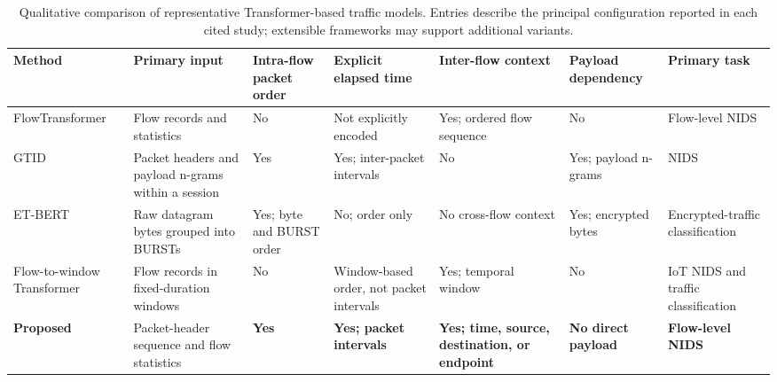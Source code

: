 \documentclass[11pt,fleqn]{report}
\begin{document}
\begin{table}[t][H]
\centering
\caption{Qualitative comparison of representative Transformer-based traffic models. Entries describe the principal configuration reported in each cited study; extensible frameworks may support additional variants.}
\label{tab:rw_model_comparison}
\scriptsize
\setlength{\tabcolsep}{2pt}
\renewcommand{\arraystretch}{1.22}
\begin{tabular}{@{}p{1.85cm}p{2.65cm}p{1.55cm}p{2.15cm}p{2.45cm}p{1.85cm}p{1.85cm}@{}}
\toprule
\textbf{Method} &
\textbf{Primary input} &
\textbf{Intra-flow packet order} &
\textbf{Explicit elapsed time} &
\textbf{Inter-flow context} &
\textbf{Payload dependency} &
\textbf{Primary task} \\
\midrule
FlowTransformer \cite{Manocchio2024FlowTransformer} &
Flow records and statistics &
No &
Not explicitly encoded &
Yes; ordered flow sequence &
No &
Flow-level NIDS \\

GTID \cite{Han2023GTID} &
Packet headers and payload n-grams within a session &
Yes &
Yes; inter-packet intervals &
No &
Yes; payload n-grams &
NIDS \\

ET-BERT \cite{Lin2022ETBERT} &
Raw datagram bytes grouped into BURSTs &
Yes; byte and BURST order &
No; order only &
No cross-flow context &
Yes; encrypted bytes &
Encrypted-traffic classification \\

Flow-to-window Transformer \cite{MartinReizabal2026FlowWindow} &
Flow records in fixed-duration windows &
No &
Window-based order, not packet intervals &
Yes; temporal window &
No &
IoT NIDS and traffic classification \\

\textbf{Proposed} &
Packet-header sequence and flow statistics &
\textbf{Yes} &
\textbf{Yes; packet intervals} &
\textbf{Yes; time, source, destination, or endpoint} &
\textbf{No direct payload} &
\textbf{Flow-level NIDS} \\
\bottomrule
\end{tabular}
\end{table}
\end{document}
